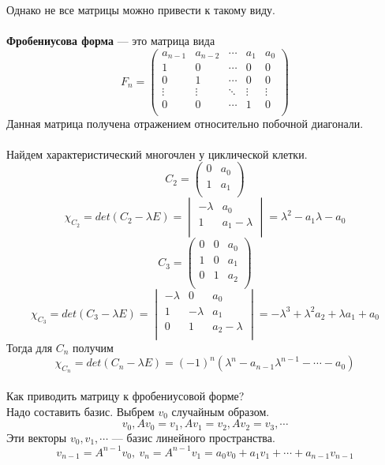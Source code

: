 \documentclass[12pt]{article}
\theoremstyle{definition}
\numberwithin{equation}{section}
\begin{document}
Однако не все матрицы можно привести к такому виду.\\ \\
\textbf{Фробениусова форма} --- это матрица вида
\[F_n=\begin{pmatrix}
a_{n-1} & a_{n-2} & \cdots & a_1 & a_0 \\
1 & 0 & \cdots & 0 & 0 \\
0 & 1 & \cdots & 0 & 0 \\
\vdots & \vdots & \ddots & \vdots & \vdots \\
0 & 0 & \cdots & 1 & 0 \\
\end{pmatrix}\]
Данная матрица получена отражением относительно побочной диагонали.\\
\\
Найдем характеристический многочлен у циклической клетки.\\
\[C_2=\begin{pmatrix}
0 & a_0 \\
1 & a_1 \\
\end{pmatrix}\]
\[\chi_{C_2}= det(C_2-\lambda E)=\begin{vmatrix}
-\lambda & a_0 \\
1 & a_1-\lambda \\
\end{vmatrix}=\lambda^2-a_1\lambda-a_0\]
\[C_3=\begin{pmatrix}
0 & 0 & a_0 \\
1 &  0 & a_1 \\
0 & 1 & a_2 \\
\end{pmatrix}\]
\[\chi_{C_3}= det(C_3-\lambda E)=\begin{vmatrix}
-\lambda & 0 & a_0 \\
1 & -\lambda & a_1\\
0 & 1 & a_2-\lambda \\
\end{vmatrix}=-\lambda^3+\lambda^2a_2+\lambda a_1+a_0\]
Тогда для $C_n$ получим
$$\chi_{C_n}=det(C_n-\lambda E)=(-1)^n(\lambda^n-a_{n-1}\lambda^{n-1}-\cdots-a_0)$$
\\
Как приводить матрицу к фробениусовой форме?\\
Надо составить базис. Выбрем $v_0$ случайным образом.\\
$$v_0, Av_0=v_1, Av_1=v_2, Av_2=v_3,\cdots$$
Эти векторы $v_0, v_1,\cdots$ --- базис линейного пространства.\\
$$v_{n-1}=A^{n-1}v_0,~v_n=A^{n-1}v_1=a_0v_0+a_1v_1+\cdots +a_{n-1}v_{n-1}$$
\end{document}

